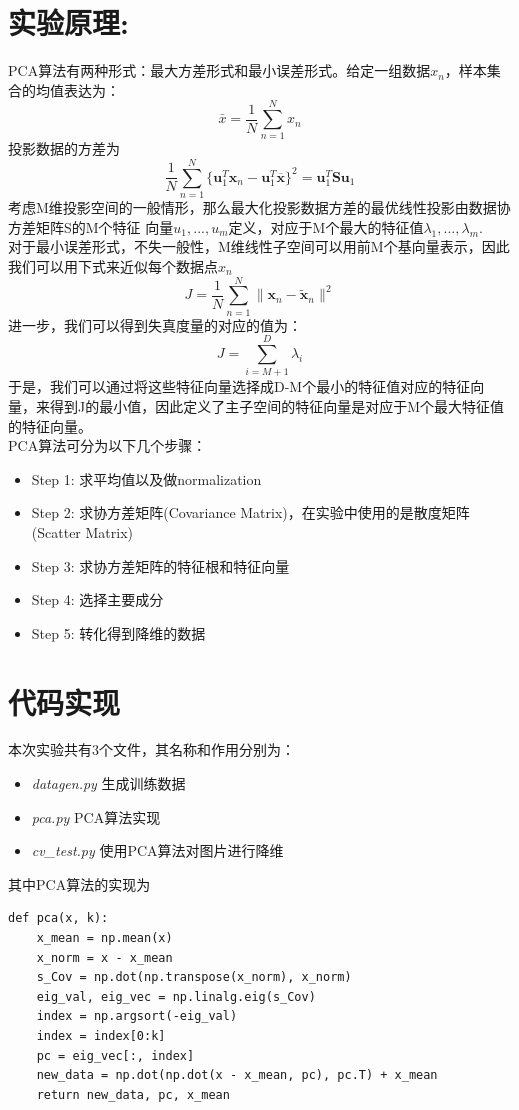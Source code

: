 \documentclass[a4paper,11pt,UTF8]{ctexart}
\begin{document}
\section{实验原理:}
PCA算法有两种形式：最大方差形式和最小误差形式。给定一组数据${x_{n}}$，样本集合的均值表达为：
$$ \bar x = \frac{1}{N} \sum_{n=1}^{N}x_{n}$$
投影数据的方差为
$$
\frac{1}{N} \sum_{n=1}^{N}\{\boldsymbol{u}_{1}^{T} \boldsymbol{x}_{n}-\boldsymbol{u}_{1}^{T} \overline{\boldsymbol{x}}\}^{2}=\boldsymbol{u}_{1}^{T} \boldsymbol{S} \boldsymbol{u}_{1}
$$
考虑M维投影空间的一般情形，那么最大化投影数据方差的最优线性投影由数据协方差矩阵S的M个特征 向量$u_{1},...,u_{m}$定义，对应于M个最大的特征值$\lambda_{1}, ..., \lambda_{m}$. \\
对于最小误差形式，不失⼀般性，M维线性⼦空间可以⽤前M个基向量表⽰，因此我们可以⽤下式来近似每个数据点$x_{n}$
$$
J=\frac{1}{N} \sum_{n=1}^{N}\|\boldsymbol{x}_{n}-\tilde{\boldsymbol{x}}_{n}\|^{2}
$$
进一步，我们可以得到失真度量的对应的值为：
$$ J = \sum_{i = M + 1}^{D} \lambda_{i}$$
于是，我们可以通过将这些特征向量选择成D-M个最小的特征值对应的特征向量，来得到J的最小值，因此定义了主子空间的特征向量是对应于M个最大特征值的特征向量。 \\
PCA算法可分为以下几个步骤：
\begin{itemize}
  \item Step 1: 求平均值以及做normalization
  \item Step 2: 求协方差矩阵(Covariance Matrix)，在实验中使用的是散度矩阵(Scatter Matrix)
  \item Step 3: 求协方差矩阵的特征根和特征向量
  \item Step 4: 选择主要成分
  \item Step 5: 转化得到降维的数据
\end{itemize}
\section{代码实现}
本次实验共有3个文件，其名称和作用分别为：
\begin{itemize}
  \item \emph{datagen.py} \quad 生成训练数据
  \item \emph{pca.py} \quad PCA算法实现
  \item \emph{cv\_test.py} \quad 使用PCA算法对图片进行降维
\end{itemize}
其中PCA算法的实现为
\begin{lstlisting}[caption={PCA},captionpos=b]
def pca(x, k):
    x_mean = np.mean(x)
    x_norm = x - x_mean
    s_Cov = np.dot(np.transpose(x_norm), x_norm)
    eig_val, eig_vec = np.linalg.eig(s_Cov)
    index = np.argsort(-eig_val)
    index = index[0:k]
    pc = eig_vec[:, index]
    new_data = np.dot(np.dot(x - x_mean, pc), pc.T) + x_mean
    return new_data, pc, x_mean
\end{lstlisting}
\end{document}
